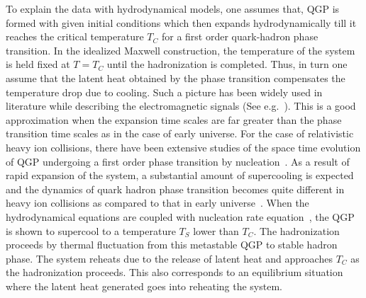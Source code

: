   To explain the data with hydrodynamical models, one assumes that, QGP 
is formed with given initial conditions which then expands
hydrodynamically till it reaches the critical temperature $T_C$ for 
a first order quark-hadron phase transition.
  In the idealized Maxwell construction, the temperature of the system 
is held fixed at $T=T_C$ until the hadronization is completed. 
Thus, in turn one assume that the latent heat obtained by the phase 
transition compensates the temperature drop due to cooling.
Such a picture has been widely used in literature while describing
the electromagnetic signals (See e.g.~\cite{SRIVASTAVA}).
  This is a good approximation when the expansion time scales are far 
greater than the phase transition time scales as in the case of early 
universe. 
  For the case of relativistic heavy ion collisions, there have
been extensive studies of the space time evolution of 
QGP undergoing a first order phase transition by 
nucleation~\cite{CSER,SHUK,INHOMO,ZABPRC}.
  As a result of rapid expansion of the system, a substantial amount of 
supercooling is expected and the dynamics of quark hadron phase 
transition becomes quite different in heavy ion collisions as compared to 
that in early universe~\cite{INHOMO,AKM}. 
 When the hydrodynamical equations are coupled with nucleation rate 
equation~\cite{SPINO}, the QGP is shown to supercool to a temperature 
$T_S$ lower than $T_C$. The hadronization proceeds by thermal fluctuation
from this metastable QGP to stable hadron phase. The system 
reheats due to the release of latent heat and approaches $T_C$ as 
the hadronization proceeds. 
This also corresponds to an equilibrium situation where the latent heat 
generated goes into reheating the system. 

